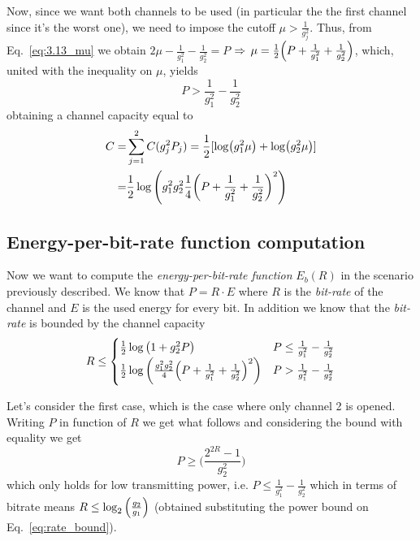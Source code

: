 Now, since we want both channels to be used (in particular the the first channel since it's the worst one), we need to impose the cutoff $\mu > \frac{1}{g_j^2}$. Thus, from Eq.~\eqref{eq:3.13_mu} we obtain $2\mu-\frac{1}{g_1^2}-\frac{1}{g_2^2}=P$ $\Rightarrow \, \mu = \frac{1}{2}\qty( P+\frac{1}{g_1^2}+\frac{1}{g_2^2} )$, which, united with the inequality on $\mu$, yields
%
\begin{equation}
P > \frac{1}{g_1^2}-\frac{1}{g_2^2}
\end{equation}
%
obtaining a channel capacity equal to
%
\begin{align}
\begin{split}
C =& \sum_{j=1}^2 C(g_j^2P_j) = \frac{1}{2}[\log(g_1^2\mu) + \log(g_2^2\mu)]\\
=& \frac{1}{2}\log\qty( g_1^2 g_2^2 \frac{1}{4}\qty( P+\frac{1}{g_1^2}+\frac{1}{g_2^2} )^2 )
\end{split}
\end{align}

\subsection{Energy-per-bit-rate function computation}

Now we want to compute the \textit{energy-per-bit-rate function} $E_b(R)$ in the scenario previously described. We know that $P = R \cdot E$ where $R$ is the \textit{bit-rate} of the channel and $E$ is the used energy for every bit. In addition we know that the \textit{bit-rate} is bounded by the channel capacity
%
\begin{equation} \label{eq:rate_bound}
R \leq
	\begin{cases}
	\frac{1}{2} \log\big( 1 + g_2^2P \big) & P \leq \frac{1}{g_1^2} - \frac{1}{g_2^2}\\
	\frac{1}{2}\log\qty( \frac{g_1^2 g_2^2}{4}\qty( P+\frac{1}{g_1^2}+\frac{1}{g_2^2} )^2 ) & P > \frac{1}{g_1^2} - \frac{1}{g_2^2}
	\end{cases}
\end{equation}

Let's consider the first case, which is the case where only channel 2 is opened. Writing $P$ in function of $R$ we get what follows and considering the bound with equality we get
%
\begin{equation}
P \geq \Big(\frac{2^{2R}-1}{g_2^2}\Big)
\end{equation}
%
which only holds for low transmitting power, i.e. $P\leq \frac{1}{g_1^2} - \frac{1}{g_2^2}$ which in terms of bitrate means $R \leq \log_2 \qty(\frac{g_2}{g_1})$ (obtained substituting the power bound on Eq.~\eqref{eq:rate_bound}).

